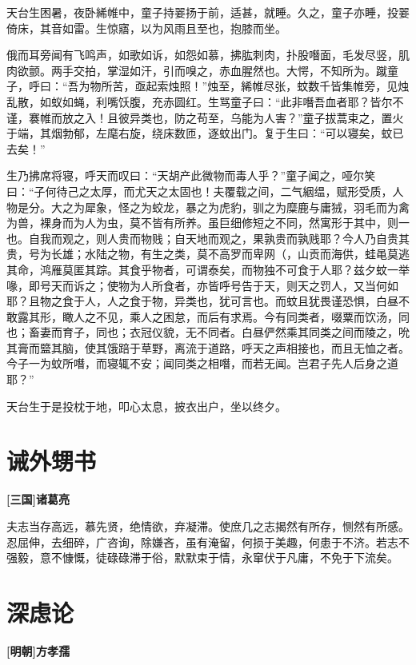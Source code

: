 \documentclass[UTF8,titlepage,oneside]{ctexbook}
\begin{document}
天台生困暑，夜卧絺帷中，童子持翣扬于前，适甚，就睡。久之，童子亦睡，投翣倚床，其音如雷。生惊寤，以为风雨且至也，抱膝而坐。


俄而耳旁闻有飞鸣声，如歌如诉，如怨如慕，拂肱刺肉，扑股噆面，毛发尽竖，肌肉欲颤。两手交拍，掌湿如汗，引而嗅之，赤血腥然也。大愕，不知所为。蹴童子，呼曰：“吾为物所苦，亟起索烛照！”烛至，絺帷尽张，蚊数千皆集帷旁，见烛乱散，如蚁如蝇，利嘴饫腹，充赤圆红。生骂童子曰：“此非噆吾血者耶？皆尔不谨，褰帷而放之入！且彼异类也，防之苟至，乌能为人害？”童子拔蒿束之，置火于端，其烟勃郁，左麾右旋，绕床数匝，逐蚊出门。复于生曰：“可以寝矣，蚊已去矣！”


生乃拂席将寝，呼天而叹曰：“天胡产此微物而毒人乎？”童子闻之，哑尔笑曰：“子何待己之太厚，而尤天之太固也！夫覆载之间，二气絪缊，赋形受质，人物是分。大之为犀象，怪之为蛟龙，暴之为虎豹，驯之为糜鹿与庸狨，羽毛而为禽为兽，裸身而为人为虫，莫不皆有所养。虽巨细修短之不同，然寓形于其中，则一也。自我而观之，则人贵而物贱；自天地而观之，果孰贵而孰贱耶？今人乃自贵其贵，号为长雄；水陆之物，有生之类，莫不高罗而卑网（，山贡而海供，蛙黾莫逃其命，鸿雁莫匿其踪。其食乎物者，可谓泰矣，而物独不可食于人耶？兹夕蚊一举喙，即号天而诉之；使物为人所食者，亦皆呼号告于天，则天之罚人，又当何如耶？且物之食于人，人之食于物，异类也，犹可言也。而蚊且犹畏谨恐惧，白昼不敢露其形，瞰人之不见，乘人之困怠，而后有求焉。今有同类者，啜粟而饮汤，同也；畜妻而育子，同也；衣冠仪貌，无不同者。白昼俨然乘其同类之间而陵之，吮其膏而盬其脑，使其饿踣于草野，离流于道路，呼天之声相接也，而且无恤之者。今子一为蚊所噆，而寝辄不安；闻同类之相噆，而若无闻。岂君子先人后身之道耶？”


天台生于是投枕于地，叩心太息，披衣出户，坐以终夕。



\chapter*{诫外甥书}
\begin{center}
	\textbf{[三国]诸葛亮}
\end{center}

夫志当存高远，慕先贤，绝情欲，弃凝滞。使庶几之志揭然有所存，恻然有所感。忍屈伸，去细碎，广咨询，除嫌吝，虽有淹留，何损于美趣，何患于不济。若志不强毅，意不慷慨，徒碌碌滞于俗，默默束于情，永窜伏于凡庸，不免于下流矣。



\chapter*{深虑论}
\begin{center}
	\textbf{[明朝]方孝孺}
\end{center}
\end{document}

